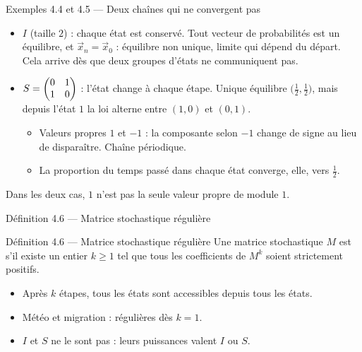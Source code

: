 \begin{frame}{Exemples 4.4 et 4.5 --- Deux chaînes qui ne convergent pas}
  \small
  \begin{itemize}
    \item $I$ (taille $2$) : chaque état est conservé. Tout vecteur de
      probabilités est un équilibre, et $\vec x_n=\vec x_0$ : équilibre
      non unique, limite qui dépend du départ. Cela arrive dès que deux
      groupes d'états ne communiquent pas.
    \item $S=\begin{pmatrix}0 & 1\\ 1 & 0\end{pmatrix}$ : l'état change à chaque étape. Unique
      équilibre $\big(\tfrac12,\tfrac12\big)$, mais depuis l'état $1$ la
      loi alterne entre $(1,0)$ et $(0,1)$.
      \begin{itemize}
        \item Valeurs propres $1$ et $-1$ : la composante selon $-1$ change
          de signe au lieu de disparaître. Chaîne périodique.
        \item La proportion du temps passé dans chaque état converge,
          elle, vers $\tfrac12$.
      \end{itemize}
  \end{itemize}
  \vspace{4pt}
  Dans les deux cas, $1$ n'est pas la seule valeur propre de module $1$.
\end{frame}

\begin{frame}{Définition 4.6 --- Matrice stochastique régulière}
  \begin{Enonce}{Définition 4.6 --- Matrice stochastique régulière}
    Une matrice stochastique $M$ est  s'il existe un
    entier $k\geq1$ tel que tous les coefficients de $M^k$ soient
    strictement positifs.
  \end{Enonce}
  \small
  \begin{itemize}
    \item Après $k$ étapes, tous les états sont accessibles depuis tous
      les états.
    \item Météo et migration : régulières dès $k=1$.
    \item $I$ et $S$ ne le sont pas : leurs puissances valent $I$ ou $S$.
  \end{itemize}
\end{frame}


